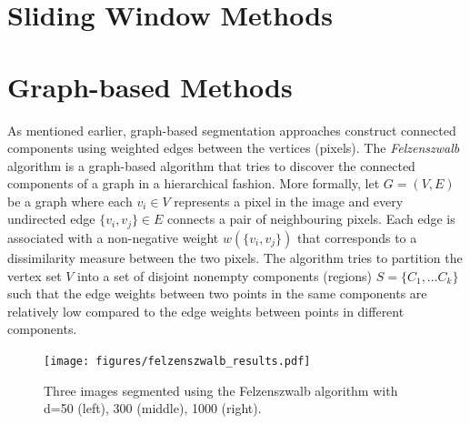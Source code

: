 \section{Sliding Window Methods}


\section{Graph-based Methods}
As mentioned earlier, graph-based segmentation approaches construct connected components using weighted edges between the vertices (pixels). The \emph{Felzenszwalb} algorithm is a graph-based algorithm that tries to discover the connected components of a graph in a hierarchical fashion.
More formally, let $G = (V, E)$ be a graph where each $v_i \in V$ represents a pixel in the image and every undirected edge $\{v_i, v_j\} \in E$ connects a pair of neighbouring pixels. Each edge is associated with a non-negative weight $w(\{v_i, v_j\})$ that corresponds to a dissimilarity measure between the two pixels.
The algorithm tries to partition the vertex set $V$ into a set of disjoint nonempty components (regions) $S = \{C_1, \ldots C_k\}$ such that the edge weights between two points in the same components are relatively low compared to the edge weights between points in different components.

\begin{figure}[ht]
    \centering
    \texttt{[image: figures/felzenszwalb\_results.pdf]}
    \caption{Three images segmented using the Felzenszwalb algorithm with d=50 (left), 300 (middle), 1000 (right).}
    \label{fig:felzenszwalb_results}
\end{figure}


